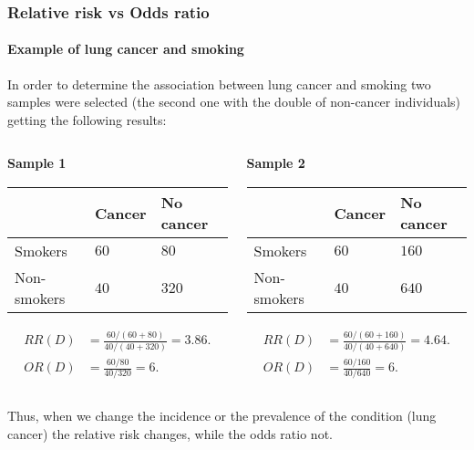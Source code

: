 \begin{frame}
\frametitle{Relative risk vs Odds ratio}
\framesubtitle{Example of lung cancer and smoking}
In order to determine the association between lung cancer and smoking two samples were selected (the second one with the double of non-cancer individuals) getting the following results:

\bigskip
\begin{columns}
\begin{column}{0.5\textwidth}
\textbf{Sample 1}
\begin{center}
\small
\begin{tabular}{|m{1.9cm}|m{1.2cm}<{\centering}|m{1.5cm}<{\centering}|}
\cline{2-3}
\multicolumn{1}{c|}{} & Cancer & No cancer\\ 
\hline
Smokers & $60$ & $80$\\ 
\hline 
Non-smokers & $40$ & $320$\\ 
\hline
\end{tabular}
\end{center}

\begin{align*}
RR(D) &= \frac{60/(60+80)}{40/(40+320)} = 3.86.\\
OR(D) &= \frac{60/80}{40/320} = 6. 
\end{align*}
\end{column}
\begin{column}{0.5\textwidth}
\textbf{Sample 2}
\begin{center}
\small
\begin{tabular}{|m{1.9cm}|m{1.2cm}<{\centering}|m{1.5cm}<{\centering}|}
\cline{2-3}
\multicolumn{1}{c|}{} & Cancer & No cancer\\ 
\hline
Smokers & $60$ & $160$\\ 
\hline 
Non-smokers & $40$ & $640$\\ 
\hline
\end{tabular}
\end{center}

\begin{align*}
RR(D) &= \frac{60/(60+160)}{40/(40+640)} = 4.64.\\
OR(D) &= \frac{60/160}{40/640} = 6. 
\end{align*}
\end{column}
\end{columns}
Thus, when we change the incidence or the prevalence of the condition (lung cancer) the relative risk changes, while the odds ratio not. 
\end{frame}


